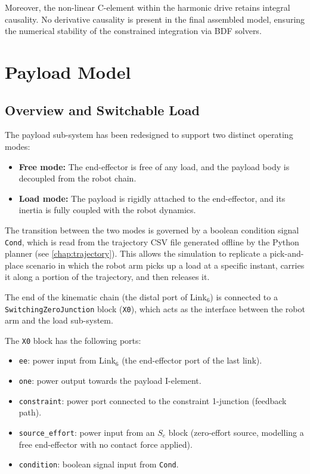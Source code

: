 Moreover, the non-linear C-element within the harmonic drive retains integral causality. No derivative causality is present in the final assembled model, ensuring the numerical stability of the constrained integration via BDF solvers. 

\section{Payload Model}
\label{sec:payload}

\subsection{Overview and Switchable Load}

The payload sub-system has been redesigned to support two distinct operating modes: 
\begin{itemize}
  \item \textbf{Free mode:} The end-effector is free of any load, and the payload body is decoupled from the robot chain.
  \item \textbf{Load mode:} The payload is rigidly attached to the end-effector, and its inertia is fully coupled with the robot dynamics.
\end{itemize}
The transition between the two modes is governed by a boolean condition signal \texttt{Cond}, which is read from the trajectory CSV file generated offline by the Python planner (see \cref{chap:trajectory}).
This allows the simulation to replicate a pick-and-place scenario in which the robot arm picks up a load at a specific instant, carries it along a portion of the trajectory, and then releases it.

The end of the kinematic chain (the distal port of Link$_6$) is connected to a \newline
\texttt{SwitchingZeroJunction} block (\texttt{X0}), which acts as the interface between the robot arm and the load sub-system.

The \texttt{X0} block has the following ports:
\begin{itemize}
  \item \texttt{ee}: power input from Link$_6$ (the end-effector port of the last link).
  \item \texttt{one}: power output towards the payload I-element.
  \item \texttt{constraint}: power port connected to the constraint 1-junction (feedback path).
  \item \texttt{source\_effort}: power input from an $S_e$ block (zero-effort source, modelling a free end-effector with no contact force applied).
  \item \texttt{condition}: boolean signal input from \texttt{Cond}.
\end{itemize}

